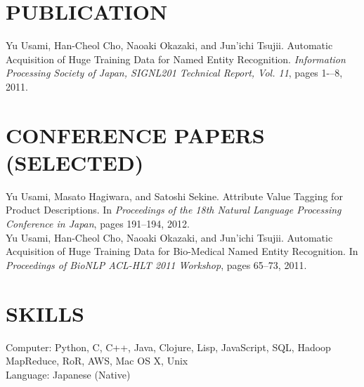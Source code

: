 \documentclass[10pt]{res}
\begin{document}
\begin{resume}
\section{\uppercase{Publication}}
Yu Usami, Han-Cheol Cho, Naoaki Okazaki, and Jun'ichi Tsujii. Automatic Acquisition of Huge Training Data for Named Entity Recognition. \textit{Information Processing Society of Japan, SIGNL201 Technical Report, Vol. 11}, pages 1-–8, 2011.

\section{\uppercase{Conference Papers (Selected)}}
Yu Usami, Masato Hagiwara, and Satoshi Sekine. Attribute Value Tagging for Product Descriptions. In \textit{Proceedings of the 18th Natural Language Processing Conference in Japan}, pages 191--194, 2012.\\
Yu Usami, Han-Cheol Cho, Naoaki Okazaki, and Jun'ichi Tsujii. Automatic Acquisition of Huge Training Data for Bio-Medical Named Entity Recognition. In \textit{Proceedings of BioNLP ACL-HLT 2011 Workshop}, pages 65--73, 2011.

\section{\uppercase{Skills}}
Computer: Python, C, C++, Java, Clojure, Lisp, JavaScript, SQL, Hadoop MapReduce, RoR, AWS, Mac OS X, Unix \\
Language: Japanese (Native)

\end{resume}
\end{document}
